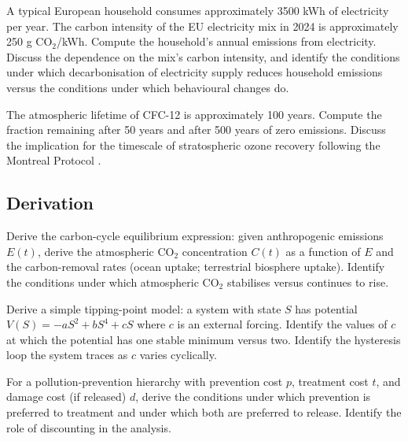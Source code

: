 \begin{exercise}
A typical European household consumes approximately 3500 kWh of electricity per year. The carbon intensity of the EU electricity mix in 2024 is approximately 250 g CO$_2$/kWh. Compute the household's annual emissions from electricity. Discuss the dependence on the mix's carbon intensity, and identify the conditions under which decarbonisation of electricity supply reduces household emissions versus the conditions under which behavioural changes do.
\end{exercise}

\begin{exercise}
The atmospheric lifetime of CFC-12 is approximately 100 years. Compute the fraction remaining after 50 years and after 500 years of zero emissions. Discuss the implication for the timescale of stratospheric ozone recovery following the Montreal Protocol \cite{law:montreal-protocol-1987}.
\end{exercise}

\subsection*{Derivation}

\begin{exercise}
Derive the carbon-cycle equilibrium expression: given anthropogenic emissions $E(t)$, derive the atmospheric CO$_2$ concentration $C(t)$ as a function of $E$ and the carbon-removal rates (ocean uptake; terrestrial biosphere uptake). Identify the conditions under which atmospheric CO$_2$ stabilises versus continues to rise.
\end{exercise}

\begin{exercise}
Derive a simple tipping-point model: a system with state $S$ has potential $V(S) = -aS^2 + bS^4 + cS$ where $c$ is an external forcing. Identify the values of $c$ at which the potential has one stable minimum versus two. Identify the hysteresis loop the system traces as $c$ varies cyclically.
\end{exercise}

\begin{exercise}
For a pollution-prevention hierarchy with prevention cost $p$, treatment cost $t$, and damage cost (if released) $d$, derive the conditions under which prevention is preferred to treatment and under which both are preferred to release. Identify the role of discounting in the analysis.
\end{exercise}

